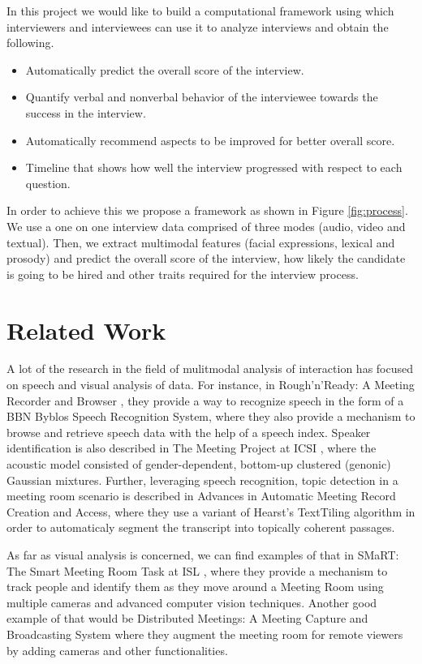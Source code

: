 \documentclass[11pt]{article}
\begin{document}
In this project we would like to build a computational framework using which interviewers and interviewees can use it to analyze interviews and obtain the following.
\begin{itemize}
\item Automatically predict the overall score of the interview.
\item Quantify verbal and nonverbal behavior of the interviewee towards the success in the interview.
\item Automatically recommend aspects to be improved for better overall score. 
\item Timeline that shows how well the interview progressed with respect to each question.
\end{itemize}

In order to achieve this we propose a framework as shown in Figure \ref{fig:process}. We use a one on one interview data comprised of three modes (audio, video and textual). Then, we extract multimodal features (facial expressions, lexical and prosody) and predict the overall score of the interview, how likely the candidate is going to be hired and other traits required for the interview process.


\section{Related Work}
A lot of the research in the field of mulitmodal analysis of interaction has focused on speech and visual analysis of data. For instance, in Rough'n'Ready: A Meeting Recorder and Browser \cite{kubala1999rough}, they provide a way to recognize speech in the form of a BBN Byblos Speech Recognition System, where they also provide a mechanism to browse and retrieve speech data with the help of a speech index. Speaker identification is also described in The Meeting Project at ICSI \cite{morgan2001meeting}, where the acoustic model consisted of gender-dependent, bottom-up clustered (genonic) Gaussian mixtures. Further, leveraging speech recognition, topic detection in a meeting room scenario is described in Advances in Automatic Meeting Record Creation and Access, where they use a variant of Hearst's TextTiling algorithm in order to automaticaly segment the transcript into topically coherent passages.

As far as visual analysis is concerned, we can find examples of that in SMaRT: The Smart Meeting Room Task at ISL \cite{waibel2003smart}, where they provide a mechanism to track people and identify them as they move around a Meeting Room using multiple cameras and advanced computer vision techniques. Another good example of that would be Distributed Meetings: A Meeting Capture and Broadcasting System \cite{cutler2002distributed} where they augment the meeting room for remote viewers by adding cameras and other functionalities.
\end{document}

